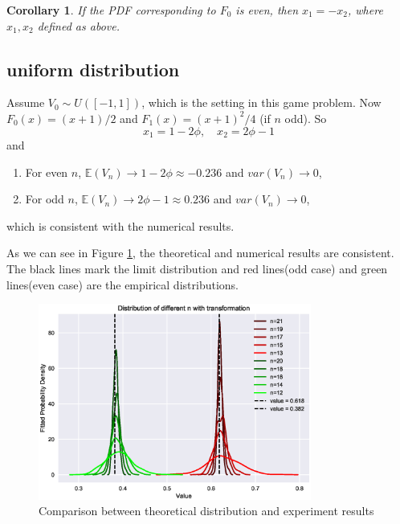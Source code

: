 \documentclass[a4paper,english]{article}
\newtheorem{col}{Corollary}[section]
\begin{document}
\begin{spacing}{1.4}
\begin{col}
  If the PDF corresponding to $F_0$ is even, then $x_1 = -x_2$, where $x_1, x_2$ defined as above.
\end{col}

\subsection{uniform distribution}
Assume $V_0 \sim U([-1, 1])$, which is the setting in this game problem. Now $F_0(x) = (x+1)/2$ and $F_1(x) = (x+1)^2/4$ (if $n$ odd). So
\begin{equation}
  x_1 = 1 - 2\phi, \quad x_2 = 2\phi - 1
\end{equation}
and
\begin{enumerate}
  \item For even $n$, $\mathbb{E} (V_n) \to 1 - 2\phi \approx -0.236$ and $var(V_n) \to 0$,
  \item For odd $n$, $\mathbb{E} (V_n) \to 2\phi - 1 \approx 0.236$ and $var(V_n) \to 0$,
\end{enumerate}
which is consistent with the numerical results.

As we can see in Figure \ref{Comparison}, the theoretical and numerical results are consistent. The black lines mark the limit distribution and red lines(odd case) and green lines(even case) are the empirical distributions.
\begin{figure}[htb!] \label{Comparison}
\centering
\includegraphics[width=0.8\textwidth]{figures/plot7.eps}
\caption{Comparison between theoretical distribution and experiment results}
\end{figure}


\end{spacing}
\end{document}
